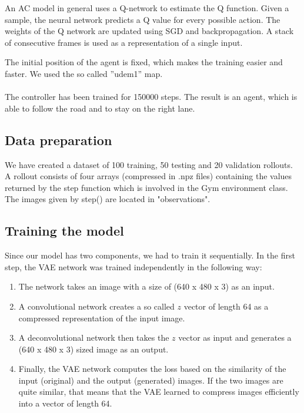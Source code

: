 \documentclass{article}
\begin{document}
An AC model in general uses a Q-network to estimate the Q function. Given a sample, the neural network predicts a Q value for every possible action. The weights of the Q network are updated using SGD and backpropagation. A stack of consecutive frames is used as a representation of a single input.



The initial position of the agent is fixed, which makes the training easier and faster. We used the so called ''udem1'' map.\\\\

The controller has been trained for 150000 steps. The result is an agent, which is able to follow the road and to stay on the right lane.


\subsection{Data preparation}
We have created a dataset of 100 training, 50 testing and 20 validation rollouts. A rollout consists of four arrays (compressed in .npz files) containing the values returned by the step function which is involved in the Gym environment class. The images given by step() are located in "observations".

\subsection{Training the model}
Since our model has two components, we had to train it sequentially. In the first step, the VAE network was trained independently in the following way:
\begin{enumerate}
    \item The network takes an image with a size of (640 x 480 x 3) as an input.
    \item A convolutional network creates a so called $z$ vector of length 64 as a compressed representation of the input image.
    \item A deconvolutional network then takes the $z$ vector as input and generates a (640 x 480 x 3) sized image as an output.
    \item Finally, the VAE network computes the loss based on the similarity of the input (original) and the output (generated) images. If the two images are quite similar, that means that the VAE learned to compress images efficiently into a vector of length 64.
\end{enumerate}
\end{document}
